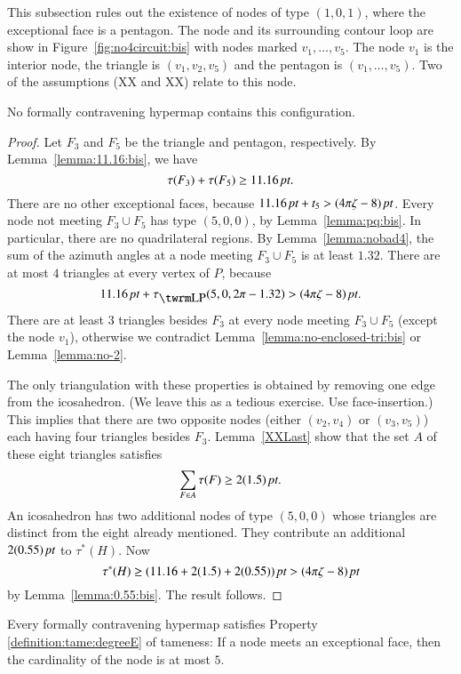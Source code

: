 This subsection rules out the existence of nodes of type $(1,0,1)$,
where the exceptional face is a pentagon.  The node and its
surrounding contour loop are show in Figure~\ref{fig:no4circuit:bis}
with nodes marked $v_1,\ldots,v_5$. The node $v_1$ is the interior
node, the triangle is $(v_1,v_2,v_5)$ and the pentagon is
$(v_1,\ldots,v_5)$. Two of the assumptions (XX and XX) relate to
this node.

\begin{lemma}\label{lemma:nobad4}
No formally contravening hypermap contains this configuration.
\end{lemma}

\begin{proof}
Let $F_3$ and $F_5$ be the triangle and pentagon, respectively. By
Lemma~\ref{lemma:11.16:bis}, we have
    $$\tau(F_3)+\tau(F_5)\ge 11.16\,\hbox{\it pt}.$$
There are no other exceptional faces, because
$11.16\,\hbox{\it pt}+t_5>(4\pi\zeta-8)\,\hbox{\it pt}$. Every node not meeting $F_3\cup F_5$ has
type $(5,0,0)$, by Lemma~\ref{lemma:pq:bis}. In particular, there
are no quadrilateral regions.  By Lemma~\ref{lemma:nobad4}, the sum
of the azimuth angles at a node meeting $F_3\cup F_5$ is at least
$1.32$. There are at most $4$ triangles at every vertex of $P$,
because
    $$
    11.16\,\pt+\tauLP(5,0,2\pi-1.32)>\squander.
    $$
There are at least $3$ triangles besides $F_3$ at every node meeting
$F_3\cup F_5$ (except the node $v_1$), otherwise we contradict
Lemma~\ref{lemma:no-enclosed-tri:bis} or Lemma~\ref{lemma:no-2}.

The only triangulation with these properties is obtained by removing
one edge from the icosahedron.  (We leave this as a tedious
exercise.  Use face-insertion.) This implies that there are two
opposite nodes (either $(v_2,v_4)$ or $(v_3,v_5)$) each having four
triangles besides $F_3$.   Lemma~\ref{XXLast} show that the set $A$
of these eight triangles satisfies
    $$
    \sum_{F\in A} \tau(F) \ge 2(1.5)\,\hbox{\it pt}.
    $$
An icosahedron has two additional nodes of type $(5,0,0)$ whose
triangles are distinct from the eight already mentioned.  They
contribute an additional $2(0.55)\,\hbox{\it pt}$ to $\tau^*(H)$.   Now
$$\tau^*(H)\ge (11.16+2(1.5)+2(0.55))\,\hbox{\it pt}>(4\pi\zeta-8)\,\hbox{\it pt}$$ by
Lemma~\ref{lemma:0.55:bis}.   The result follows.
\end{proof}

\begin{lemma} \label{lemma:deg5}
Every formally contravening hypermap satisfies Property
\ref{definition:tame:degreeE} of tameness: If a node meets an
exceptional face, then the cardinality of the node is at most $5$.
\end{lemma}

